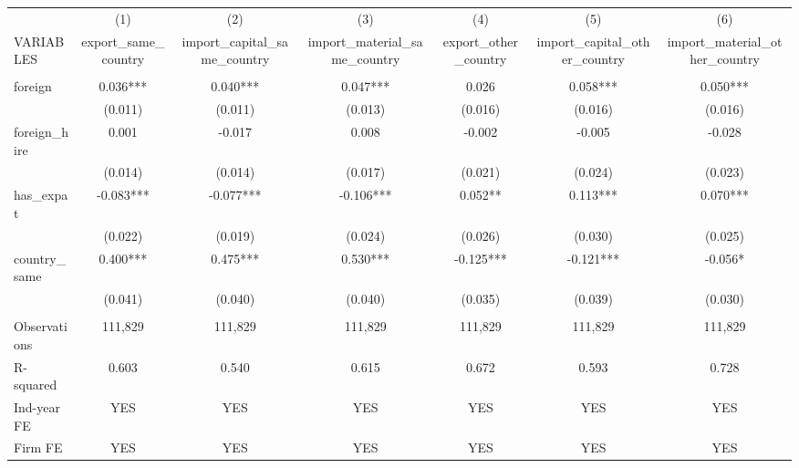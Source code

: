 \begin{tabular}{lcccccc} \hline
 & (1) & (2) & (3) & (4) & (5) & (6) \\
VARIABLES & export\_same\_country & import\_capital\_same\_country & import\_material\_same\_country & export\_other\_country & import\_capital\_other\_country & import\_material\_other\_country \\ \hline
 &  &  &  &  &  &  \\
foreign & 0.036*** & 0.040*** & 0.047*** & 0.026 & 0.058*** & 0.050*** \\
 & (0.011) & (0.011) & (0.013) & (0.016) & (0.016) & (0.016) \\
foreign\_hire & 0.001 & -0.017 & 0.008 & -0.002 & -0.005 & -0.028 \\
 & (0.014) & (0.014) & (0.017) & (0.021) & (0.024) & (0.023) \\
has\_expat & -0.083*** & -0.077*** & -0.106*** & 0.052** & 0.113*** & 0.070*** \\
 & (0.022) & (0.019) & (0.024) & (0.026) & (0.030) & (0.025) \\
country\_same & 0.400*** & 0.475*** & 0.530*** & -0.125*** & -0.121*** & -0.056* \\
 & (0.041) & (0.040) & (0.040) & (0.035) & (0.039) & (0.030) \\
 &  &  &  &  &  &  \\
Observations & 111,829 & 111,829 & 111,829 & 111,829 & 111,829 & 111,829 \\
R-squared & 0.603 & 0.540 & 0.615 & 0.672 & 0.593 & 0.728 \\
Ind-year FE & YES & YES & YES & YES & YES & YES \\
 Firm FE & YES & YES & YES & YES & YES & YES \\ \hline
\end{tabular}

